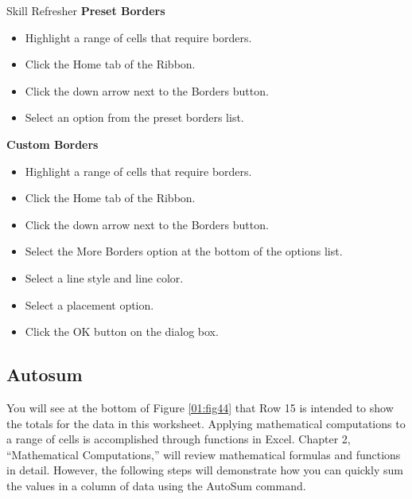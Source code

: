 \begin{center}
	\begin{sklbox}{Skill Refresher}
		\textbf{Preset Borders}
		\\
		\begin{itemize}
			\setlength{\itemsep}{0pt}
			\setlength{\parskip}{0pt}
			\setlength{\parsep}{0pt}
			
			\item Highlight a range of cells that require borders.
			\item Click the Home tab of the Ribbon.
			\item Click the down arrow next to the Borders button.
			\item Select an option from the preset borders list.
			
		\end{itemize}

		\hfill \break
		\textbf{Custom Borders}
		\\
		\begin{itemize}
			\setlength{\itemsep}{0pt}
			\setlength{\parskip}{0pt}
			\setlength{\parsep}{0pt}
			
			\item Highlight a range of cells that require borders.
			\item Click the Home tab of the Ribbon.
			\item Click the down arrow next to the Borders button.
			\item Select the More Borders option at the bottom of the options list.
			\item Select a line style and line color.
			\item Select a placement option.
			\item Click the OK button on the dialog box.
			
		\end{itemize}

	\end{sklbox}
\end{center}

\subsection{Autosum}

You will see at the bottom of Figure \ref{01:fig44} that Row 15 is intended to show the totals for the data in this worksheet. Applying mathematical computations to a range of cells is accomplished through functions in Excel. Chapter 2, ``Mathematical Computations,'' will review mathematical formulas and functions in detail. However, the following steps will demonstrate how you can quickly sum the values in a column of data using the AutoSum command.

